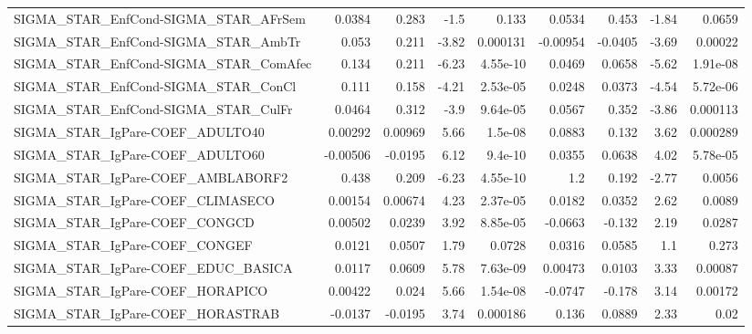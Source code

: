 \begin{tabular}{lrrrrrrrr}
SIGMA\_STAR\_EnfCond-SIGMA\_STAR\_AFrSem  &      0.0384 &        0.283 &     -1.5 &    0.133 &     0.0534 &       0.453 &        -1.84 &        0.0659 \\
SIGMA\_STAR\_EnfCond-SIGMA\_STAR\_AmbTr   &       0.053 &        0.211 &    -3.82 & 0.000131 &   -0.00954 &     -0.0405 &        -3.69 &       0.00022 \\
SIGMA\_STAR\_EnfCond-SIGMA\_STAR\_ComAfec &       0.134 &        0.211 &    -6.23 & 4.55e-10 &     0.0469 &      0.0658 &        -5.62 &      1.91e-08 \\
SIGMA\_STAR\_EnfCond-SIGMA\_STAR\_ConCl   &       0.111 &        0.158 &    -4.21 & 2.53e-05 &     0.0248 &      0.0373 &        -4.54 &      5.72e-06 \\
SIGMA\_STAR\_EnfCond-SIGMA\_STAR\_CulFr   &      0.0464 &        0.312 &     -3.9 & 9.64e-05 &     0.0567 &       0.352 &        -3.86 &      0.000113 \\
SIGMA\_STAR\_IgPare-COEF\_ADULTO40       &     0.00292 &      0.00969 &     5.66 &  1.5e-08 &     0.0883 &       0.132 &         3.62 &      0.000289 \\
SIGMA\_STAR\_IgPare-COEF\_ADULTO60       &    -0.00506 &      -0.0195 &     6.12 &  9.4e-10 &     0.0355 &      0.0638 &         4.02 &      5.78e-05 \\
SIGMA\_STAR\_IgPare-COEF\_AMBLABORF2     &       0.438 &        0.209 &    -6.23 & 4.55e-10 &        1.2 &       0.192 &        -2.77 &        0.0056 \\
SIGMA\_STAR\_IgPare-COEF\_CLIMASECO      &     0.00154 &      0.00674 &     4.23 & 2.37e-05 &     0.0182 &      0.0352 &         2.62 &        0.0089 \\
SIGMA\_STAR\_IgPare-COEF\_CONGCD         &     0.00502 &       0.0239 &     3.92 & 8.85e-05 &    -0.0663 &      -0.132 &         2.19 &        0.0287 \\
SIGMA\_STAR\_IgPare-COEF\_CONGEF         &      0.0121 &       0.0507 &     1.79 &   0.0728 &     0.0316 &      0.0585 &          1.1 &         0.273 \\
SIGMA\_STAR\_IgPare-COEF\_EDUC\_BASICA    &      0.0117 &       0.0609 &     5.78 & 7.63e-09 &    0.00473 &      0.0103 &         3.33 &       0.00087 \\
SIGMA\_STAR\_IgPare-COEF\_HORAPICO       &     0.00422 &        0.024 &     5.66 & 1.54e-08 &    -0.0747 &      -0.178 &         3.14 &       0.00172 \\
SIGMA\_STAR\_IgPare-COEF\_HORASTRAB      &     -0.0137 &      -0.0195 &     3.74 & 0.000186 &      0.136 &      0.0889 &         2.33 &          0.02 \\

\end{tabular}
